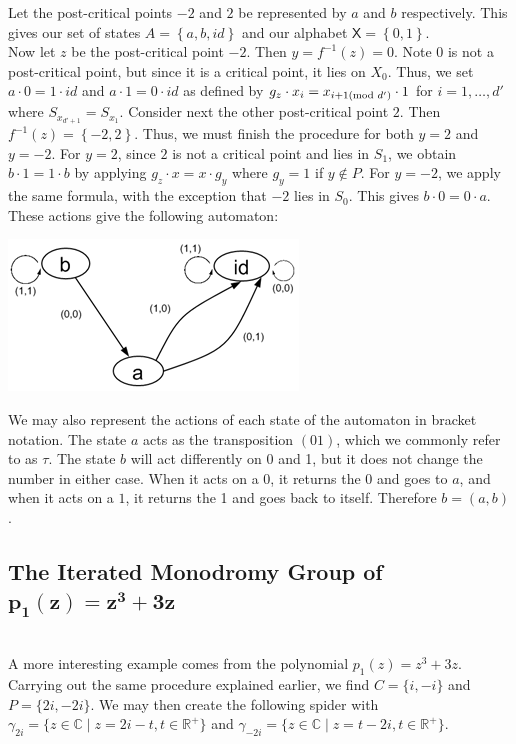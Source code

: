 \documentclass[11pt]{amsart}
\theoremstyle{definition}
\theoremstyle{remark}
\numberwithin{equation}{section}
\begin{document}
\indent Let the post-critical points $-2$ and $2$ be represented by $a$ and $b$ respectively. This gives our set of states $A = \left\{a,b,id\right\}$ and our alphabet $\textsf{X} = \left\{0,1\right\}$.\\
\indent Now let $z$ be the post-critical point $-2$. Then $y = f^{-1}(z) = 0$. Note $0$ is not a post-critical point, but since it is a critical point, it lies on $X_0$. Thus, we set $a \cdot 0 = 1 \cdot id$ and $ a \cdot 1 = 0 \cdot id$ as defined by $g_z \cdot x_i = x_{i+1 (\textmd{mod } d')} \cdot 1$ for $i = 1,\ldots,d'$ where $S_{{x}_{d'+1}} = S_{{x}_{1}}$. Consider next the other post-critical point $2$. Then $f^{-1}(z) = \left\{-2,2\right\}$. Thus, we must finish the procedure for both $y=2$ and $y=-2$. For $y = 2$, since $2$ is not a critical point and lies in $S_1$, we obtain $b \cdot 1 = 1 \cdot b$ by applying $g_z \cdot x = x \cdot g_y$ where $g_y = 1$ if $y \notin P$. For $y = -2$, we apply the same formula, with the exception that $-2$ lies in $S_0$. This gives $b \cdot 0 = 0 \cdot a$. These actions give the following automaton:\\

\begin{center}
\includegraphics{z_2.png}
\end{center}

\indent We may also represent the actions of each state of the automaton in bracket notation. The state $a$ acts as the transposition $(01)$, which we commonly refer to as $\tau$. The state $b$ will act differently on 0 and 1, but it does not change the number in either case. When it acts on a $0$, it returns the 0 and goes to $a$, and when it acts on a $1$, it returns the 1 and goes back to itself. Therefore $b = (a,b)$.

\subsection{The Iterated Monodromy Group of $\mathbf{p_1(z)=z^3+3z}$} \text{\space}\\

\indent A more interesting example comes from the polynomial $p_1(z) = z^3 + 3z$.  Carrying out the same procedure explained earlier, we find $C = \{i, -i\}$ and $P = \{2i, -2i\}$. We may then create the following spider with $\gamma_{2i} =\{z \in \mathbb{C} \mid z =  2i-t, t \in \mathbb{R^+}\}$ and $\gamma_{-2i} = \{z \in \mathbb{C} \mid z =  t-2i, t \in \mathbb{R^+}\} $.\\
\end{document}
